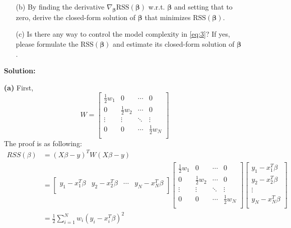 \documentclass[10pt]{article}
\begin{document}
\begin{enumerate}[1.]
\begin{itemize}
		      \item[(b)] By finding the derivative $\nabla_{\bm{\beta}}\textrm{RSS}(\bm{\beta})$ w.r.t. $\bm\beta$ and setting that to zero,
		            derive the closed-form solution of $\bm{\beta}$ that minimizes $\textrm{RSS}(\bm{\beta})$.~

		      \item[(c)] Is there any way to control the model complexity in \eqref{eq:3}? If yes,
		            please formulate the $\textrm{RSS}(\bm\beta)$ and estimate its closed-form solution of $\bm\beta$.~

	      \end{itemize}
	\textbf{Solution:}
		\item[\textbf{(a)}] First, 
		$$W = \begin{bmatrix}
			\frac{1}{2}w_1 &0  & \cdots   & 0  \\
			0 & \frac{1}{2}w_2  & \cdots   & 0  \\
			\vdots & \vdots  & \ddots   & \vdots  \\
			0 & 0  & \cdots  & \frac{1}{2}w_N \\
			\end{bmatrix}
		$$
		The proof is as following:
		$$
		\begin{aligned}
			RSS(\beta) &= (X\beta-y)^T W (X\beta-y)
			\\&=
			\begin{bmatrix}
				y_1-x_1^T\beta &y_2-x_2^T\beta  & \cdots   & y_N-x_N^T\beta \\
			\end{bmatrix} 
			\begin{bmatrix}
			\frac{1}{2}w_1 &0  & \cdots   & 0  \\
			0 & \frac{1}{2}w_2  & \cdots   & 0  \\
			\vdots & \vdots  & \ddots   & \vdots  \\
			0 & 0  & \cdots  & \frac{1}{2}w_N \\
			\end{bmatrix} 
			\begin{bmatrix}
				y_1-x_1^T\beta   \\
				y_2-x_2^T\beta   \\
				\vdots 		     \\
				y_N-x_N^T\beta   \\
			\end{bmatrix}
			\\&=\frac{1}{2}\sum_{i=1}^{N}w_{i}(y_{i} -x_{i}^{T}\beta)^{2}
		\end{aligned}
$$
\end{enumerate}
\end{document}
